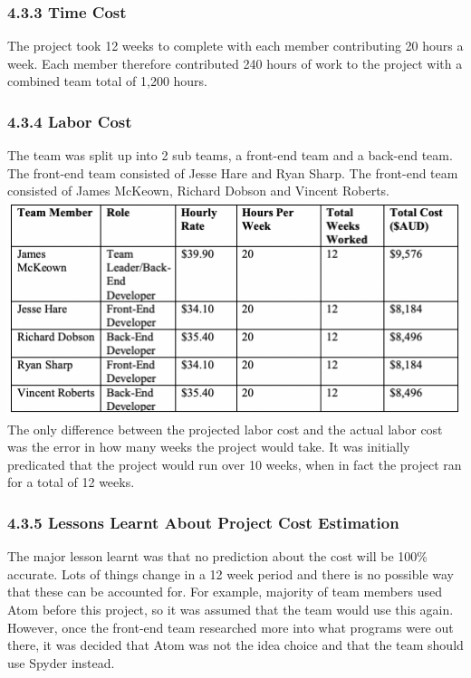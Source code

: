 \documentclass[11pt]{article}
\begin{document}
\begin{adjustwidth}{1cm}{}
\subsubsection{4.3.3 Time Cost}
The project took 12 weeks to complete with each member contributing 20 hours a week. Each member therefore contributed 240 hours of work to the project with a combined team total of 1,200 hours.

\subsubsection{4.3.4 Labor Cost}
The team was split up into 2 sub teams, a front-end team and a back-end team. The front-end team consisted of Jesse Hare and Ryan Sharp. The front-end team consisted of James McKeown, Richard Dobson and Vincent Roberts. \\

\includegraphics[scale=0.71]{team_cost.png} \\

The only difference between the projected labor cost and the actual labor cost was the error in how many weeks the project would take. It was initially predicated that the project would run over 10 weeks, when in fact the project ran for a total of 12 weeks.

\subsubsection{4.3.5 Lessons Learnt About Project Cost Estimation}
The major lesson learnt was that no prediction about the cost will be 100\% accurate. Lots of things change in a 12 week period and there is no possible way that these can be accounted for. For example, majority of team members used Atom before this project, so it was assumed that the team would use this again. However, once the front-end team researched more into what programs were out there, it was decided that Atom was not the idea choice and that the team should use Spyder instead. \\

\end{adjustwidth}
\end{document}
